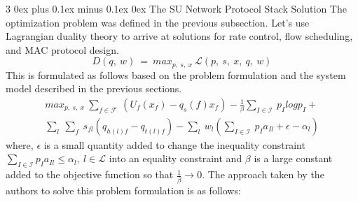 \documentclass[12pt, draftcls, onecolumn]{IEEEtran}
\makeatletter
\def\subsubsection{\@startsection{subsubsection}%
                                 {3}%
                                 {\z@}%
                                 {0ex plus 0.1ex minus 0.1ex}%
                                 {0ex}%
                                 {\normalfont\normalsize\bfseries}}%
\makeatother
\begin{document}
\subsubsection{The SU Network Protocol Stack Solution}
The optimization problem was defined in the previous subsection. Let's use Lagrangian duality theory to arrive at solutions for rate control, flow scheduling, and MAC protocol design.
\[D(q,\ w)\ =\ max_{p,\ s,\ x}\ \mathcal{L}(p,\ s,\ x,\ q,\ w)\]
This is formulated as follows based on the problem formulation and the system model described in the previous sections.
\begin{equation}
    \begin{aligned}
        max_{p,\ s,\ x}\ \sum_{f \in \mathcal{F}}\ (U_f(x_f) - q_s(f)x_f) - \frac{1}{\beta}\sum_{I \in \mathcal{I}}\ p_I log p_I + \\\sum_{l}\ \sum_{f}\ s_{fl}(q_{h(l)f} - q_{t(l)f}) - \sum_{l}\ w_l(\sum_{I \in \mathcal{I}}\ p_I a_{Il} + \epsilon - \alpha_l)
    \end{aligned}
\end{equation}
where, $\epsilon$ is a small quantity added to change the inequality constraint $\sum_{I \in \mathcal{I}} p_I a_{Il} \leq \alpha_l,\ l \in \mathcal{L}$ into an equality constraint and $\beta$ is a large constant added to the objective function so that $\frac{1}{\beta} \rightarrow 0$.
The approach taken by the authors to solve this problem formulation is as follows:
\end{document}
